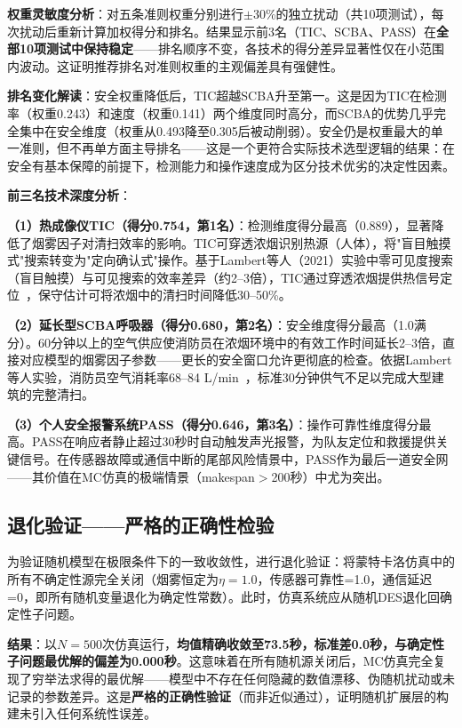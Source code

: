\documentclass[12pt,a4paper]{ctexart}
\begin{document}
\textbf{权重灵敏度分析}：对五条准则权重分别进行$\pm$30\%的独立扰动（共10项测试），每次扰动后重新计算加权得分和排名。结果显示前3名（TIC、SCBA、PASS）在\textbf{全部10项测试中保持稳定}——排名顺序不变，各技术的得分差异显著性仅在小范围内波动。这证明推荐排名对准则权重的主观偏差具有强健性。

\textbf{排名变化解读}：安全权重降低后，TIC超越SCBA升至第一。这是因为TIC在检测率（权重0.243）和速度（权重0.141）两个维度同时高分，而SCBA的优势几乎完全集中在安全维度（权重从0.493降至0.305后被动削弱）。安全仍是权重最大的单一准则，但不再单方面主导排名——这是一个更符合实际技术选型逻辑的结果：在安全有基本保障的前提下，检测能力和操作速度成为区分技术优劣的决定性因素。

\textbf{前三名技术深度分析}：

\textbf{（1）热成像仪TIC（得分0.754，第1名）}：检测维度得分最高（0.889），显著降低了烟雾因子对清扫效率的影响。TIC可穿透浓烟识别热源（人体），将"盲目触摸式"搜索转变为"定向确认式"操作。基于Lambert等人（2021）实验中零可见度搜索（盲目触摸）与可见搜索的效率差异（约2--3倍），TIC通过穿透浓烟提供热信号定位~\cite{lambert2021searchrescue}，保守估计可将浓烟中的清扫时间降低30--50\%。

\textbf{（2）延长型SCBA呼吸器（得分0.680，第2名）}：安全维度得分最高（1.0满分）。60分钟以上的空气供应使消防员在浓烟环境中的有效工作时间延长2--3倍，直接对应模型的烟雾因子参数——更长的安全窗口允许更彻底的检查。依据Lambert等人实验，消防员空气消耗率68--84 L/min~\cite{lambert2021searchrescue}，标准30分钟供气不足以完成大型建筑的完整清扫。

\textbf{（3）个人安全报警系统PASS（得分0.646，第3名）}：操作可靠性维度得分最高。PASS在响应者静止超过30秒时自动触发声光报警，为队友定位和救援提供关键信号。在传感器故障或通信中断的尾部风险情景中，PASS作为最后一道安全网——其价值在MC仿真的极端情景（makespan$>$200秒）中尤为突出。

\subsection{退化验证——严格的正确性检验}

为验证随机模型在极限条件下的一致收敛性，进行退化验证：将蒙特卡洛仿真中的所有不确定性源完全关闭（烟雾恒定为$\eta=1.0$，传感器可靠性=1.0，通信延迟=0，即所有随机变量退化为确定性常数）。此时，仿真系统应从随机DES退化回确定性子问题。

\textbf{结果}：以$N=500$次仿真运行，\textbf{均值精确收敛至73.5秒，标准差0.0秒，与确定性子问题最优解的偏差为0.000秒}。这意味着在所有随机源关闭后，MC仿真完全复现了穷举法求得的最优解——模型中不存在任何隐藏的数值漂移、伪随机扰动或未记录的参数差异。这是\textbf{严格的正确性验证}（而非近似通过），证明随机扩展层的构建未引入任何系统性误差。
\end{document}
